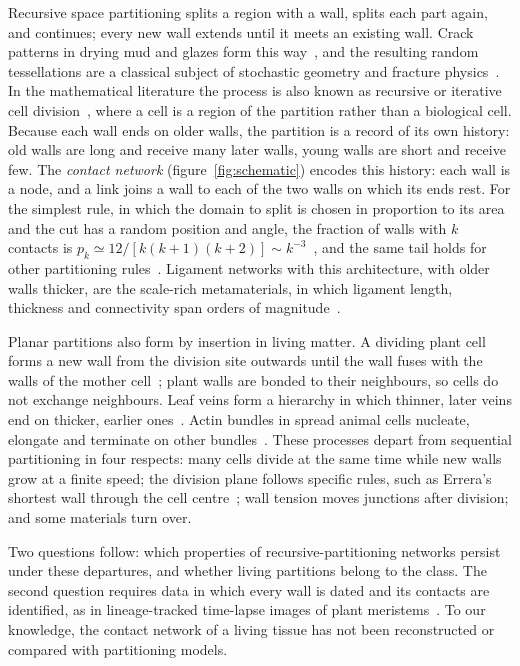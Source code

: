\documentclass[11pt,a4paper]{article}
\begin{document}
Recursive space partitioning splits a region with a wall, splits each part again, and
continues; every new wall extends until it meets an existing wall. Crack patterns in drying
mud and glazes form this way~\cite{bohn2005,bohn2005b,bohn2005prl}, and the resulting random
tessellations are a classical subject of stochastic geometry and fracture
physics~\cite{gilbert1967,nagel2005,cowan2010,andresen2013}. In the mathematical literature
the process is also known as recursive or iterative cell division~\cite{cowan2010}, where a
cell is a region of the partition rather than a biological cell. Because each wall ends on
older walls, the partition is a record of its own history: old walls are long and receive many
later walls, young walls are short and receive few. The \emph{contact network}
(figure~\ref{fig:schematic}) encodes this history: each wall is a node, and a link joins a
wall to each of the two walls on which its ends rest. For the simplest rule, in which the
domain to split is chosen in proportion to its area and the cut has a random position and
angle, the fraction of walls with $k$ contacts is $p_k\simeq12/[k(k+1)(k+2)]\sim
k^{-3}$~\cite{vazquez2026sr}, and the same tail holds for other partitioning
rules~\cite{vazquez2026div}. Ligament networks with this architecture, with older walls
thicker, are the scale-rich metamaterials, in which ligament length, thickness and
connectivity span orders of magnitude~\cite{both2026}.

Planar partitions also form by insertion in living matter. A dividing plant cell forms a new
wall from the division site outwards until the wall fuses with the walls of the mother
cell~\cite{besson2011}; plant walls are bonded to their neighbours, so cells do not exchange
neighbours. Leaf veins form a hierarchy in which thinner, later veins end on thicker, earlier
ones~\cite{couder2002,bohn2002}. Actin bundles in spread animal cells nucleate, elongate and
terminate on other bundles~\cite{tojkander2015,vignaud2021}. These processes depart from
sequential partitioning in four respects: many cells divide at the same time while new walls
grow at a finite speed; the division plane follows specific rules, such as Errera's shortest
wall through the cell centre~\cite{errera1888,besson2011}; wall tension moves junctions after
division; and some materials turn over.

Two questions follow: which properties of recursive-partitioning networks persist under these
departures, and whether living partitions belong to the class. The second question requires
data in which every wall is dated and its contacts are identified, as in lineage-tracked
time-lapse images of plant meristems~\cite{willis2016,refahi2021}. To our knowledge, the
contact network of a living tissue has not been reconstructed or compared with partitioning
models.
\end{document}
